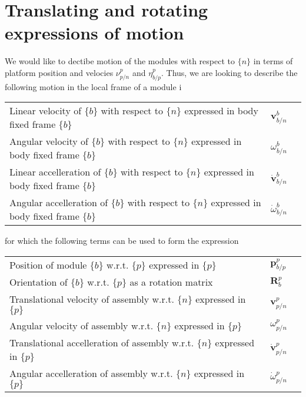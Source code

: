 \section{Translating and rotating expressions of motion}
We would like to dectibe motion of the modules with respect to $\{n\}$ in terms of platform position and velocies $ \nu_{p/n}^{p}$ and $\eta_{b/p}^{p}$. Thus, we are looking to describe the following motion in the local frame of a module i
\begin{table}[H]
	\centering
	\begin{tabular}{|l|l|l}
		Linear velocity of $\{b\}$ with respect to $\{n\}$ expressed in body fixed frame $\{b\}$     & $\textbf{v}_{b/n}^{b}$ 	& \\[10pt] %
		Angular velocity of $\{b\}$ with respect to $\{n\}$ expressed in body fixed frame $\{b\}$         & $\omega_{b/n}^{b}$ 		& \\[10pt] %
		Linear accelleration of $\{b\}$ with respect to $\{n\}$ expressed in body fixed frame $\{b\}$ & $\dot{\textbf{v}}_{b/n}^{b}$ & \\[10pt]
		Angular accelleration of $\{b\}$ with respect to $\{n\}$ expressed in body fixed frame $\{b\}$      & $\dot{\omega}_{b/n}^{b}$ & \\[10pt]
	\end{tabular}
\end{table}

for which the following terms can be used to form the expression
\begin{table}[H]
	\centering
	\begin{tabular}{|l|l|l}
		Position of module $\{b\}$ w.r.t. $\{p\}$ expressed in $\{p\}$  					& $\textbf{p}_{b/p}^{p}$ 		&\\[10pt] %
		Orientation of $\{b\}$ w.r.t. $\{p\}$ as a rotation matrix		   	& $\textbf{R}_{b}^{p}$ 	&  \\[10pt]
		Translational velocity of assembly w.r.t. $\{n\}$ expressed in $\{p\}$    	& $\textbf{v}_{p/n}^{p}$ 		&\\[10pt]%
		Angular velocity of assembly w.r.t. $\{n\}$ expressed in $\{p\}$  			& $\omega_{p/n}^{p}$ 			&\\[10pt]%
		Translational accelleration of assembly w.r.t. $\{n\}$ expressed in $\{p\}$ & $\dot{\textbf{v}}_{p/n}^{p}$ 	& 	\\[10pt]
		Angular accelleration of assembly w.r.t. $\{n\}$ expressed in $\{p\}$       & $\dot{\omega}_{p/n}^{p}$ 		& 	\\[10pt]
	\end{tabular}
\end{table}

